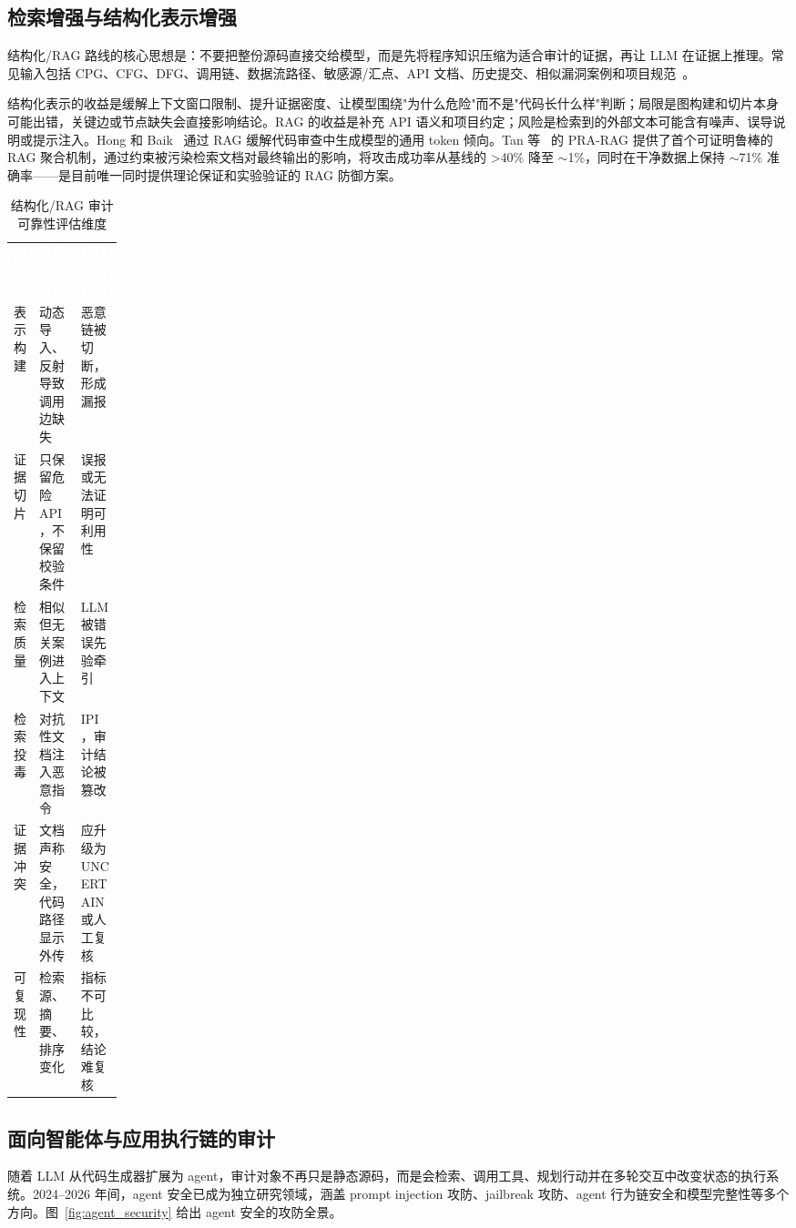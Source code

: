 \documentclass[11pt,a4paper,onecolumn]{article}
\newcommand{\tabheader}[1]{\textcolor{white}{\textbf{#1}}}
\begin{document}
\subsection{检索增强与结构化表示增强}
结构化/RAG 路线的核心思想是：不要把整份源码直接交给模型，而是先将程序知识压缩为适合审计的证据，再让 LLM 在证据上推理。常见输入包括 CPG、CFG、DFG、调用链、数据流路径、敏感源/汇点、API 文档、历史提交、相似漏洞案例和项目规范~\cite{program_analysis_survey_2025,synergizing_static_llm_2025,llmxcpg_2025}。

结构化表示的收益是缓解上下文窗口限制、提升证据密度、让模型围绕"为什么危险"而不是"代码长什么样"判断；局限是图构建和切片本身可能出错，关键边或节点缺失会直接影响结论。RAG 的收益是补充 API 语义和项目约定；风险是检索到的外部文本可能含有噪声、误导说明或提示注入。Hong 和 Baik~\cite{hong_2025_rag_review} 通过 RAG 缓解代码审查中生成模型的通用 token 倾向。Tan 等~\cite{tan2026prarag} 的 PRA-RAG 提供了首个可证明鲁棒的 RAG 聚合机制，通过约束被污染检索文档对最终输出的影响，将攻击成功率从基线的 >40\% 降至 $\sim$1\%，同时在干净数据上保持 $\sim$71\% 准确率——是目前唯一同时提供理论保证和实验验证的 RAG 防御方案。

\begin{table}[htbp]
\caption{结构化/RAG 审计可靠性评估维度}
\label{tab:rag_reliability}
\centering
\small
\begin{tabularx}{\linewidth}{@{} p{0.14\linewidth}X X @{}}
\rowcolor{tabhead}
\tabheader{层次} & \tabheader{典型失败模式} & \tabheader{对结论的影响} \\
\rowcolor{tabalt} 表示构建 & 动态导入、反射导致调用边缺失 & 恶意链被切断，形成漏报 \\
证据切片 & 只保留危险 API，不保留校验条件 & 误报或无法证明可利用性 \\
\rowcolor{tabalt} 检索质量 & 相似但无关案例进入上下文 & LLM 被错误先验牵引 \\
检索投毒 & 对抗性文档注入恶意指令 & IPI，审计结论被篡改 \\
\rowcolor{tabalt} 证据冲突 & 文档声称安全，代码路径显示外传 & 应升级为 UNCERTAIN 或人工复核 \\
可复现性 & 检索源、摘要、排序变化 & 指标不可比较，结论难复核 \\
\end{tabularx}
\end{table}

\subsection{面向智能体与应用执行链的审计}
随着 LLM 从代码生成器扩展为 agent，审计对象不再只是静态源码，而是会检索、调用工具、规划行动并在多轮交互中改变状态的执行系统。2024--2026 年间，agent 安全已成为独立研究领域，涵盖 prompt injection 攻防、jailbreak 攻防、agent 行为链安全和模型完整性等多个方向。图~\ref{fig:agent_security} 给出 agent 安全的攻防全景。
\end{document}

